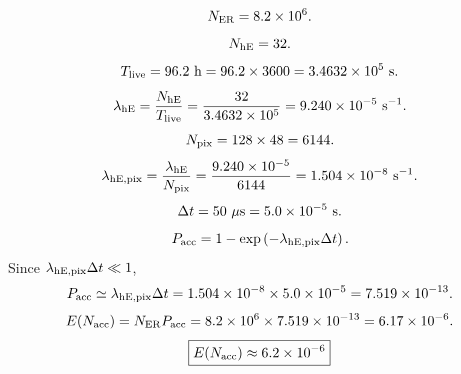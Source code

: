 \documentclass[11pt,fleqn]{article}
\begin{document}
\[
N_{\rm ER}=8.2\times 10^{6}.
\]
\[
N_{\rm hE}=32.
\]
\[
T_{\rm live}=96.2~{\rm h}
=96.2\times3600
=3.4632\times10^{5}~{\rm s}.
\]
\[
\lambda_{\rm hE}
=
\frac{N_{\rm hE}}{T_{\rm live}}
=
\frac{32}{3.4632\times10^{5}}
=
9.240\times10^{-5}~{\rm s}^{-1}.
\]
\[
N_{\rm pix}=128\times48=6144.
\]
\[
\lambda_{\rm hE,pix}
=
\frac{\lambda_{\rm hE}}{N_{\rm pix}}
=
\frac{9.240\times10^{-5}}{6144}
=
1.504\times10^{-8}~{\rm s}^{-1}.
\]
\[
\Delta t=50~\mu{\rm s}
=5.0\times10^{-5}~{\rm s}.
\]
\[
P_{\rm acc}
=
1-\exp\left(-\lambda_{\rm hE,pix}\Delta t\right).
\]
Since \(\lambda_{\rm hE,pix}\Delta t \ll 1\),
\[
P_{\rm acc}
\simeq
\lambda_{\rm hE,pix}\Delta t
=
1.504\times10^{-8}
\times
5.0\times10^{-5}
=
7.519\times10^{-13}.
\]
\[
E(N_{\rm acc})
=
N_{\rm ER}P_{\rm acc}
=
8.2\times10^{6}
\times
7.519\times10^{-13}
=
6.17\times10^{-6}.
\]
\[
\boxed{
E(N_{\rm acc})\approx6.2\times10^{-6}
}
\]
\end{document}
